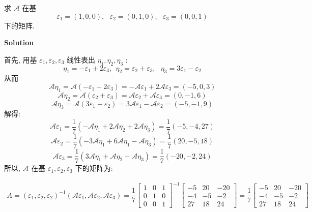 \documentclass[11pt,a4paper,openany,oneside]{book}
\newcommand\Solution{\noindent\textbf{\textsf{Solution}}\par\medskip}
\begin{document}
\begin{myexample}
	
求 $ \mathcal{A} $ 在基
 $$  \varepsilon_1=(1,0,0), \ \ \ \varepsilon_2=(0, 1, 0), \ \ \ \varepsilon_3=(0, 0, 1)   $$ 
下的矩阵. 

\end{myexample}
\Solution

首先, 用基 $ \varepsilon_1, \varepsilon_2, \varepsilon_3 $ 线性表出 $ \eta_1, \eta_2, \eta_3 $ :
 $$  \eta_1 = -\varepsilon_1 + 2\varepsilon_3, \ \ \eta_2 = \varepsilon_2 + \varepsilon_3, \ \ \ \eta_3=3\varepsilon_1 - \varepsilon_2  $$ 
从而
 $$  \mathcal{A}\eta_1 = \mathcal{A}(-\varepsilon_1 + 2\varepsilon_3) = -\mathcal{A}\varepsilon_1 + 2\mathcal{A}\varepsilon_3 = (-5, 0, 3)  $$ 
 $$  \mathcal{A}\eta_2 = \mathcal{A}(\varepsilon_2 + \varepsilon_3) = \mathcal{A}\varepsilon_2 + \mathcal{A}\varepsilon_3 = (0, -1, 6)  $$ 
 $$ \mathcal{A}\eta_3 = \mathcal{A}(3\varepsilon_1 - \varepsilon_2 ) = 3\mathcal{A}\varepsilon_1 -\mathcal{A}\varepsilon_2 = (-5, -1, 9) $$ 
解得:
 $$  \mathcal{A}\varepsilon_1 =\dfrac{1}{7}(-\mathcal{A}\eta_1 + 2\mathcal{A}\eta_2 +2\mathcal{A}\eta_3) =\dfrac{1}{7}( -5,-4 , 27)  $$ 
 $$  \mathcal{A}\varepsilon_2 =\dfrac{1}{7}(-3\mathcal{A}\eta_1+6\mathcal{A}\eta_1-\mathcal{A}\eta_3)=\dfrac{1}{7}(20 ,-5 ,18 )  $$   
 $$  \mathcal{A}\varepsilon_3 =\dfrac{1}{7}(3\mathcal{A}\eta_1+\mathcal{A}\eta_2+\mathcal{A}\eta_3)=\dfrac{1}{7}(-20 ,-2 ,24 )  $$ 
所以,  $ \mathcal{A} $ 在基 $ \varepsilon_1, \varepsilon_2, \varepsilon_3 $ 下的矩阵为:

\begin{gather*}
A = (\varepsilon_1, \varepsilon_2, \varepsilon_2)^{-1}( \mathcal{A}\varepsilon_1,  \mathcal{A}\varepsilon_2,  \mathcal{A}\varepsilon_3)=\dfrac{1}{7}
\begin{bmatrix}
1  &  0  &  1 \\
0  &  1  &  0  \\
0  &  0  &  1
\end{bmatrix}^{-1}
\begin{bmatrix}
-5  &  20  &  -20  \\
-4  &  -5  &  -2  \\
27  &  18  &  24
\end{bmatrix} =\dfrac{1}{7}
\begin{bmatrix}
-5  &  20  &  -20  \\
-4  &  -5  &  -2  \\
27  &  18  &  24
\end{bmatrix}
\end{gather*}  \\  \\  \\
\end{document}
